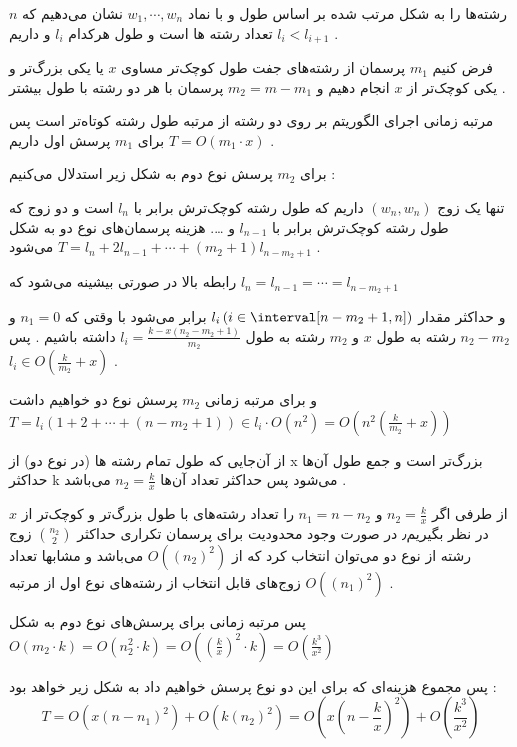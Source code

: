رشته‌ها را به شکل مرتب شده بر اساس طول و با نماد 
$w_1, \cdots, w_n$
نشان می‌دهیم که 
$n$ 
تعداد رشته ها است و 
طول هرکدام 
$l_i$
و داریم  
$l_i < l_{i+1}$
.

فرض کنیم 
$m_1$
پرسمان از رشته‌های جفت طول کوچک‌تر مساوی  
$x$
یا 
یکی بزرگ‌تر و یکی کوچک‌تر از 
$x$
انجام دهیم و 
$m_2 = m - m_1$
پرسمان با هر دو رشته با طول بیشتر
.

مرتبه زمانی 
اجرای الگوریتم بر روی دو رشته از مرتبه طول رشته کوتاه‌تر است پس برای 
$m_1$
پرسش اول داریم 
$T = O(m_1 \cdot x)$
.

برای 
$m_2$
پرسش نوع دوم به شکل زیر استدلال می‌کنیم
:

تنها 
یک زوج
$(w_n,w_n)$
داریم که طول رشته کوچک‌ترش برابر با 
$l_n$
است و دو زوج
که 
طول رشته کوچک‌ترش برابر با 
$l_{n-1}$
و \dots.
هزینه پرسمان‌های نوع دو به شکل 
$T = l_{n} + 2 l_{n-1} + \cdots + (m_2+1)l_{n-m_2+1}$
می‌شود
.

رابطه بالا در صورتی بیشینه می‌شود که 
$l_n = l_{n-1} = \cdots = l_{n-m_2+1}$

و حداکثر مقدار 
$l_i \left(i \in \interval[n-m_2+1, n] \right)$
برابر می‌شود با وقتی که 
$n_1 = 0$
و
$n_2 - m_2$
رشته به طول 
$x$ 
و 
$m_2$ 
رشته به طول 
$l_i = \frac{k-x(n_2-m_2+1)}{m_2}$
داشته باشیم 
.
پس 
$l_i \in O(\frac{k}{m_2}+x)$
.

و
برای مرتبه زمانی 
$m_2$
پرسش‌ نوع دو خواهیم داشت
$T = l_i (1 + 2 + \cdots + (n-m_2+1)) \in l_i \cdot O(n^2) = O(n^2(\frac{k}{m_2}+x))$

از آن‌جایی که طول تمام رشته ها (در نوع دو)‌ از 
x
بزرگ‌تر است و
جمع طول آن‌ها حداکثر 
k 
می‌شود پس حداکثر 
تعداد آن‌ها
$n_2 = \frac{k}{x}$
می‌باشد
.

از طرفی
اگر 
$n_2 = \frac{k}{x}$
و 
$n_1 = n - n_2$
را تعداد رشته‌های با طول بزرگ‌تر و کوچک‌تر از 
$x$
در نظر بگیریم٫
در صورت وجود محدودیت برای پرسمان تکراری حداکثر
$n_2\choose 2$
زوج
رشته از نوع دو می‌توان انتخاب کرد
که از 
$O((n_2)^2)$
می‌باشد
و
مشابها تعداد زوج‌های قابل انتخاب از رشته‌های نوع اول 
از مرتبه 
$O((n_1)^2)$
.

پس مرتبه زمانی برای پرسش‌های نوع دوم به شکل 
$O(m_2 \cdot k) = O(n_2^2\cdot k) = O((\frac{k}{x})^2 \cdot k) = O(\frac{k^3}{x^2})$

پس مجموع هزینه‌ای که برای این دو نوع پرسش خواهیم داد به شکل زیر خواهد بود
:
\begin{equation*}
    T = O(x (n-n_1)^2) + O(k(n_2)^2) = O(x (n-\frac{k}{x})^2) + O(\frac{k^3}{x^2})
\end{equation*}
